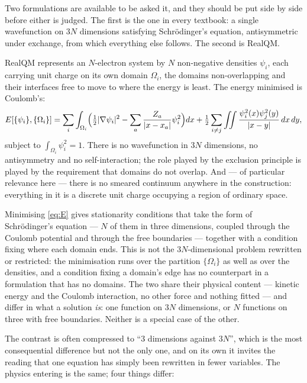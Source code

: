 \documentclass[11pt]{article}
\newcommand{\grad}{\nabla}
\newcommand{\half}{\tfrac12}
\begin{document}
Two formulations are available to be asked it, and they should be put side by side before either
is judged. The first is the one in every textbook: a single wavefunction on $3N$ dimensions
satisfying Schr\"odinger's equation, antisymmetric under exchange, from which everything else
follows. The second is RealQM.

RealQM \cite{realqm,realqmbook} represents an $N$-electron system by $N$ non-negative densities
$\psi_i$, each carrying unit charge on its own domain $\Omega_i$, the domains non-overlapping and
their interfaces free to move to where the energy is least. The energy minimised is Coulomb's:
\begin{equation}\label{eq:E}
E[\{\psi_i\},\{\Omega_i\}]=\sum_i\int_{\Omega_i}\Bigl(\half|\grad\psi_i|^2
-\sum_a\frac{Z_a}{|x-x_a|}\psi_i^2\Bigr)dx
+\half\sum_{i\neq j}\iint\frac{\psi_i^2(x)\psi_j^2(y)}{|x-y|}\,dx\,dy,
\end{equation}
subject to $\int_{\Omega_i}\psi_i^2=1$. There is no wavefunction in $3N$ dimensions, no
antisymmetry and no self-interaction; the role played by the exclusion principle is played by the
requirement that domains do not overlap. And --- of particular relevance here --- there is no smeared
continuum anywhere in the construction: everything in it is a discrete unit charge occupying a region
of ordinary space.

Minimising \eqref{eq:E} gives stationarity conditions that take the form of Schr\"odinger's
equation --- $N$ of them in three dimensions, coupled through the Coulomb potential and through the
free boundaries --- together with a condition fixing where each domain ends. This is not the
$3N$-dimensional problem rewritten or restricted: the minimisation runs over the partition
$\{\Omega_i\}$ as well as over the densities, and a condition fixing a domain's edge has no
counterpart in a formulation that has no domains. The two share their physical content --- kinetic
energy and the Coulomb interaction, no other force and nothing fitted --- and differ in what a
solution \emph{is}: one function on $3N$ dimensions, or $N$ functions on three with free
boundaries. Neither is a special case of the other.

The contrast is often compressed to ``$3$ dimensions against $3N$'', which is the most consequential
difference but not the only one, and on its own it invites the reading that one equation has simply
been rewritten in fewer variables. The physics entering is the same; four things differ:
\end{document}
